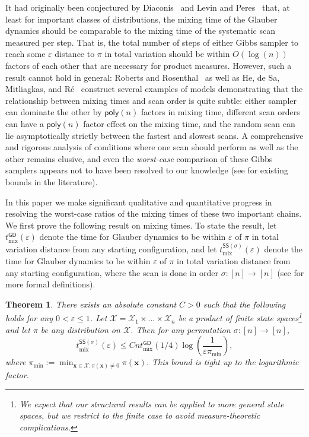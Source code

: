 \documentclass[11pt]{article}
\newtheorem{theorem}{Theorem}[section]
\begin{document}
It had originally been conjectured by Diaconis~\cite{diaconis} and Levin and Peres~\cite{levin2017markov} that, at least for important classes of distributions, the mixing time of the Glauber dynamics should be comparable to the mixing time of the systematic scan measured per step. That is, the total number of steps of either Gibbs sampler to reach some $\varepsilon$ distance to $\pi$ in total variation should be within $O(\log(n))$ factors of each other that are necessary for product measures.  However, such a result cannot hold in general: Roberts and Rosenthal~\cite{roberts2015surprising} as well as He, de Sa, Mitliagkas, and R\'e~\cite{DBLP:conf/nips/HeSMR16} construct several examples of models demonstrating that the relationship between mixing times and scan order is quite subtle: either sampler can dominate the other by $\mathsf{poly}(n)$ factors in mixing time, different scan orders can have a $\mathsf{poly}(n)$ factor effect on the mixing time, and the random scan can lie asymptotically strictly between the fastest and slowest scans. A comprehensive and rigorous analysis of conditions where one scan should perform as well as the other remains elusive, and even the \emph{worst-case} comparison of these Gibbs samplers appears not to have been resolved to our knowledge (see  for existing bounds in the literature).

In this paper we make significant 
qualitative and quantitative progress  
in 
 resolving the worst-case ratios
 of the mixing times of these two important chains. We first prove the following result on mixing times. To state the result, let $t^{\mathsf{GD}}_{\mathrm{mix}}(\varepsilon)$ denote the time for Glauber dynamics to be within $\varepsilon$ of $\pi$ in total variation distance from any starting configuration, and let $t^{\mathsf{SS}(\sigma)}_{\mathrm{mix}}(\varepsilon)$ denote the time for Glauber dynamics to be within $\varepsilon$ of $\pi$ in total variation distance from any starting configuration, where the scan is done in order $\sigma:[n]\to [n]$ (see  for more formal definitions).

\begin{theorem}
\label{thm:mixing}
    There exists an absolute constant $C>0$ such that the following holds for any $0<\varepsilon\leq 1$. Let $\mathcal{X}=\mathcal{X}_1\times \ldots\times \mathcal{X}_n$ be a product of finite state spaces\footnote{We expect that our structural results can be applied to more general state spaces, but we restrict to the finite case to avoid measure-theoretic complications.} and let $\pi$ be any distribution on $\mathcal{X}$. Then for any permutation $\sigma:[n]\to [n]$,
    \begin{equation*}
        t^{\mathsf{SS}(\sigma)}_{\mathrm{mix}}(\varepsilon)\leq Cnt^{\mathsf{GD}}_{\mathrm{mix}}(1/4)\log\left(\frac{1}{\varepsilon\pi_{\mathrm{min}}}\right),
    \end{equation*}
    where $\pi_{\mathrm{min}}:=\min_{\bm{x}\in \mathcal{X}:\pi(\bm{x})\neq 0} \pi(\bm{x})$. This bound is tight up to the logarithmic factor.
\end{theorem}
\end{document}
